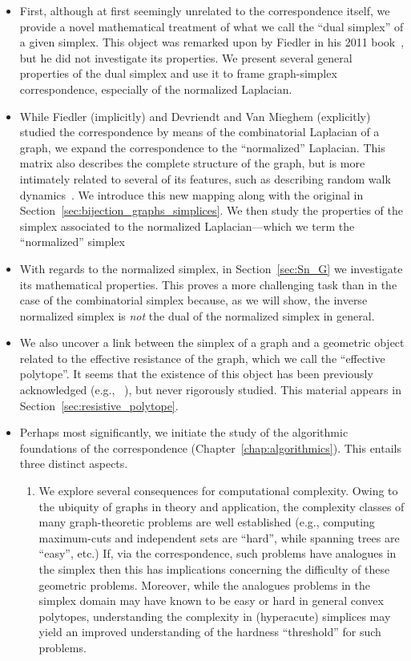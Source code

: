 \begin{itemize}
	\item First, although at first seemingly unrelated to the correspondence itself, we provide a  novel mathematical treatment of what we call the ``dual simplex'' of a given simplex. This object was remarked upon by Fiedler in his 2011 book~\cite{fiedler2011matrices}, but he did not investigate its properties. We present several general properties of  the dual simplex and use it to frame graph-simplex correspondence, especially of the normalized Laplacian. 
	\item While Fiedler (implicitly) and Devriendt and Van Mieghem (explicitly) studied the correspondence by means of the combinatorial Laplacian of a graph, we expand the correspondence to the ``normalized'' Laplacian.  This matrix also describes the complete structure of the graph, but is more intimately related to several of its features, such as describing random walk dynamics~\cite{chung1997spectral}. We introduce this new mapping  along with the original in Section~\ref{sec:bijection_graphs_simplices}. 
	We then study the properties of the simplex associated to the normalized Laplacian---which we term the ``normalized'' simplex   
	\item  With regards to the normalized simplex, in Section~\ref{sec:Sn_G} we investigate its mathematical properties. This proves a more challenging task   than  in  the case of the combinatorial simplex because, as we will show, the inverse normalized simplex  is \emph{not} the dual of the normalized  simplex in general. 
	\item We also uncover a link between the simplex of a graph and a geometric  object related to the effective resistance of the graph, which we call the ``effective polytope''. It seems that the existence of this object has been previously acknowledged (e.g., ~\cite{shayanNotes}), but never rigorously studied. This material appears in Section~\ref{sec:resistive_polytope}. 
	\item Perhaps most significantly, we initiate the study of the algorithmic foundations of the correspondence (Chapter~\ref{chap:algorithmics}). This entails three distinct aspects. 
	\begin{enumerate}
		\item 	We explore several consequences for computational  complexity.  Owing to the ubiquity of graphs in theory and application, the complexity classes of many graph-theoretic problems are  well established (e.g., computing maximum-cuts and independent sets are ``hard'', while spanning trees are ``easy'', etc.) If, via the correspondence, such problems have analogues in the simplex then this has implications concerning the difficulty of these geometric problems. Moreover, while the analogues problems in the simplex domain may have known to be easy or hard  in general convex polytopes, understanding the complexity in (hyperacute) simplices may yield an improved understanding of the hardness ``threshold'' for such problems. 

\end{enumerate}
\end{itemize}
